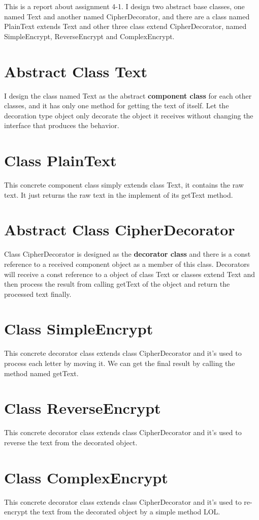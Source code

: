 \documentclass{article}
\begin{document}
	\thispagestyle{empty}
	
	This is a report about assignment 4-1. I design two abstract base classes, one named Text and another named CipherDecorator, and there are a class named PlainText extends Text and other three class extend CipherDecorator, named SimpleEncrypt, ReverseEncrypt and ComplexEncrypt.
	
	\section{Abstract Class Text}
	
	I design the class named Text as the abstract \textbf{component class} for each other classes, and it has only one method for getting the text of itself. Let the decoration type object only decorate the object it receives without changing the interface that produces the behavior.
	
	\section{Class PlainText}
	
	This concrete component class simply extends class Text, it contains the raw text.
	It just returns the raw text in the implement of its getText method.
	
	\section{Abstract Class CipherDecorator}
	
	Class CipherDecorator is designed as the \textbf{decorator class} and there is a const reference to a received component object as a member of this class. Decorators will receive a const reference to a object of class Text or classes extend Text and then process the result from calling getText of the object and return the processed text finally.
	
	\section{Class SimpleEncrypt}
	
	This concrete decorator class extends class CipherDecorator and it's used to process each letter by moving it. We can get the final result by calling the method named getText.
	
	\section{Class ReverseEncrypt}
	
	This concrete decorator class extends class CipherDecorator and it's used to reverse the text from the decorated object. 
	
	\section{Class ComplexEncrypt}
	
	This concrete decorator class extends class CipherDecorator and it's used to re-encrypt the text from the decorated object by a simple method LOL.
\end{document}
